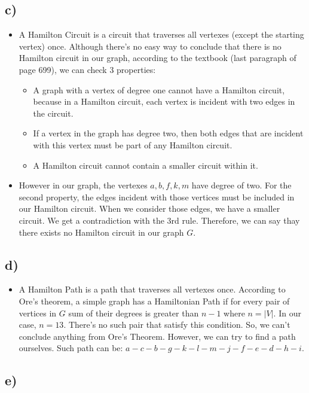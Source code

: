 \documentclass[12pt]{article}
\begin{document}
\subsection*{c)}
\begin{itemize}
 \item A Hamilton Circuit is a circuit that traverses all vertexes (except the starting vertex) once. Although there's no easy way to conclude that there is no Hamilton circuit in our graph, according to the textbook (last paragraph of page 699), we can check 3 properties:
 \begin{itemize}
	\item A graph with a vertex of degree one cannot have a Hamilton circuit, because in a Hamilton circuit, each vertex
	is incident with two edges in the circuit. 
	\item If a vertex in the graph has degree two, then both edges that are incident with this vertex must be part of any Hamilton circuit.
	\item A Hamilton circuit cannot contain a smaller circuit within it.
 \end{itemize}
 \item However in our graph, the vertexes $a, b, f, k, m$ have degree of two. For the second property, the edges incident with those vertices must be included in our Hamilton circuit. When we consider those edges, we have a smaller circuit. We get a contradiction with the 3rd rule. Therefore, we can say thay there exists no Hamilton circuit in our graph $G$.
\end{itemize}
\subsection*{d)}
\begin{itemize}
 \item A Hamilton Path is a path that traverses all vertexes once. According to Ore's theorem, a simple graph has a Hamiltonian Path if for every pair of vertices
 in $G$ sum of their degrees is greater than $n-1$ where $n = |V|$. In our case, $n = 13$. There's no such pair that satisfy this condition. So, we can't conclude anything from Ore's Theorem. However, we can try to find a path ourselves. Such path can be: $a-c-b-g-k-l-m-j-f-e-d-h-i$.
\end{itemize}
\subsection*{e)}
\end{document}
